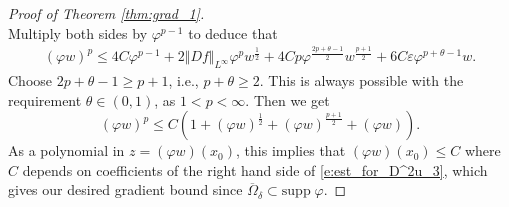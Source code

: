 \documentclass[12pt,reqno]{amsart}
\numberwithin{figure}{section}
\theoremstyle{plain}
\theoremstyle{remark}
\numberwithin{equation}{section}
\begin{document}
\begin{appendices}
\begin{proof}[Proof of Theorem \ref{thm:grad_1}]
\begin{equation*}
\end{equation*}
Multiply both sides by $\varphi^{p-1}$ to deduce that
\begin{align*}
    (\varphi w)^p \leq 4C\varphi^{p-1} + 2\Vert Df\Vert_{L^\infty}\varphi^p w^{\frac{1}{2}} + 4Cp \varphi^{\frac{2p+\theta - 1}{2}}w^{\frac{p+1}{2}} + 6C\varepsilon \varphi^{p+\theta - 1}w.
\end{align*}
Choose $2p+\theta -1 \geq p+1$, i.e., $p+\theta\geq 2$. This is always possible with the requirement $\theta \in (0,1)$, as $1<p <\infty$. Then we get
\begin{equation}\label{e:est_for_D^2u_3}
    (\varphi w)^p \leq C\left(1+ (\varphi w)^\frac{1}{2} + (\varphi w)^\frac{p+1}{2} +(\varphi w)\right).
\end{equation}
As a polynomial in $z = (\varphi w)(x_0)$, this implies that $(\varphi w)(x_0)\leq C$ where $C$ depends on coefficients of the right hand side of \eqref{e:est_for_D^2u_3}, which gives our desired gradient bound since $\overline{\Omega}_\delta\subset \mathrm{supp}\;\varphi$.
\end{proof}



\end{appendices}
\end{document}
